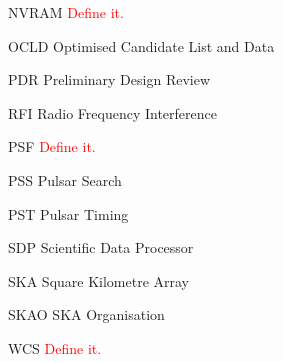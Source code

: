\documentclass[11pt,a4paper]{article}
\begin{document}
\begin{basedescript}{\desclabelstyle{\pushlabel}\desclabelwidth{6em}}
    \item[NVRAM] \textcolor{red}{Define it.} \vspace{-0.2cm}
    \item[OCLD] Optimised Candidate List and Data \vspace{-0.2cm}
    \item[PDR] Preliminary Design Review\vspace{-0.2cm}
    \item[RFI] Radio Frequency Interference\vspace{-0.2cm}
    \item[PSF] \textcolor{red}{Define it.} \vspace{-0.2cm}
    \item[PSS] Pulsar Search\vspace{-0.2cm}
    \item[PST] Pulsar Timing\vspace{-0.2cm}
    \item[SDP] Scientific Data Processor\vspace{-0.2cm}
    \item[SKA] Square Kilometre Array\vspace{-0.2cm}
    \item[SKAO] SKA Organisation\vspace{-0.2cm}
    \item[WCS] \textcolor{red}{Define it.} \vspace{-0.2cm}
\end{basedescript} 

\newcommand{\nuno}{{\left(\frac{\nu}{\nu_0}\right)}}
\newcommand{\dnuno}{{\left(\frac{\nu-\nu_0}{\nu_0}\right)}}

\newcommand{\dg}{^\dag}
\newcommand{\X}{\vec{x}}
\newcommand{\Xd}{\vec{{x}^\dag}}
\newcommand{\B}{\vec{b}}
\newcommand{\Bd}{\vec{b^\dag}}
\newcommand{\A}{{\tens{A}}}
\newcommand{\Ad}{{\tens{A^\dag}}}
\newcommand{\F}{{\tens{F}}}
\newcommand{\Fd}{{\tens{F^\dag}}}
\newcommand{\He}{{\tens{H}}}
\newcommand{\Sa}{{\tens{S}}}
\newcommand{\Sd}{{\tens{S^\dag}}}
\newcommand{\Sna}{\tens{{S_{\nu}}}}
\newcommand{\Snd}{\tens{{S_{\nu}^\dag}}}
\newcommand{\T}{{\tens{T}}}
\newcommand{\W}{{\tens{W}}}
\newcommand{\Wd}{{\tens{W^\dag}}}
\newcommand{\Pb}{{P_b}}

\newcommand{\Wim}{{\tens{W^{im}}}}
\newcommand{\Wimd}{{\tens{{W^{im}}^\dag}}}
\newcommand{\Wnt}{{\tens{W^{mfs}_t}}}
\newcommand{\Wntd}{{\tens{{W^{mfs}_t}^\dag}}}
\newcommand{\Wnp}{{\tens{W^{mfs}_p}}}
\newcommand{\Wnpd}{{\tens{{W^{mfs}_p}^\dag}}}
\newcommand{\Wnq}{{\tens{W^{mfs}_q}}}
\newcommand{\Wnqd}{{\tens{{W^{mfs}_q}^\dag}}}
\newcommand{\Wimn}{{\tens{W^{im}_{\nu}}}}
\newcommand{\Wimnd}{{\tens{{W^{im}_{\nu}}^\dag}}}
\end{document}
